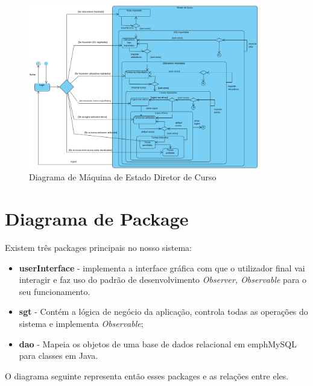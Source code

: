 \documentclass[12pt,a4paper]{report}
\begin{document}
\begin{figure}[H]
	\centering 
	\includegraphics[width=0.9\textwidth]{modelacao/diagramas_maq_estado/dc_map_estado.png}  
	\caption{Diagrama de Máquina de Estado Diretor de Curso}
\end{figure}

\chapter{Diagrama de Package}
Existem três packages principais no nosso sistema: 
\begin{itemize}
    \item \textbf{userInterface} - implementa a interface gráfica com que o utilizador final vai interagir e faz uso do padrão de desenvolvimento \textit{Observer, Observable} para o seu funcionamento.
    \item \textbf{sgt} - Contém a lógica de negócio da aplicação, controla todas as operações do sistema e implementa \textit{Observable};
    \item \textbf{dao} - Mapeia os objetos de uma base de dados relacional em emph{MySQL} para classes em Java.
\end{itemize}
O diagrama seguinte representa então esses packages e as relações entre eles.
\end{document}
